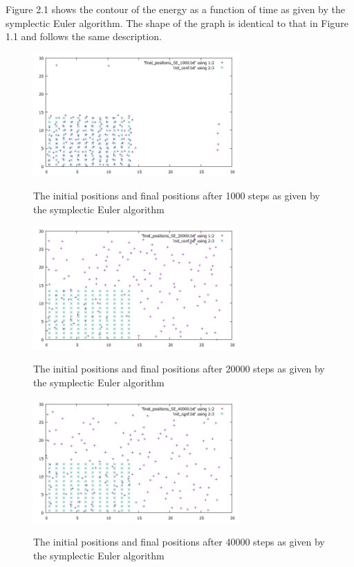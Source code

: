 \documentclass[12pt,a4paper]{article}	%
\begin{document}
Figure 2.1 shows the contour of the energy as a function of time as given by the symplectic Euler algorithm. The shape of the graph is identical to that in Figure 1.1 and follows the same description. \\

\begin{figure}[h!]	
\centering
{\includegraphics[width=0.7\textwidth]{initial_final_pos_1000_SE.png}}		
\caption{The initial positions and final positions after 1000 steps as given by the symplectic Euler algorithm}
\end{figure}

\newpage

\begin{figure}[h!]	
\centering
{\includegraphics[width=0.7\textwidth]{initial_final_pos_20000_SE.png}}		
\caption{The initial positions and final positions after 20000 steps as given by the symplectic Euler algorithm}
\end{figure}

\begin{figure}[h!]	
\centering
{\includegraphics[width=0.7\textwidth]{initial_final_pos_40000_SE.png}}		
\caption{The initial positions and final positions after 40000 steps as given by the symplectic Euler algorithm}
\end{figure}
\end{document}
